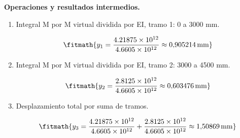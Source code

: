 \noindent\textbf{Operaciones y resultados intermedios.}

\begin{enumerate}

\item Integral M por M virtual dividida por EI, tramo 1: 0 a 3000 mm.

\[\fitmath{y_{1}=\frac{4.21875\times10^{12}}{4.6605\times10^{12}}\approx 0{,}905214\,\mathrm{mm}}\]

\item Integral M por M virtual dividida por EI, tramo 2: 3000 a 4500 mm.

\[\fitmath{y_{2}=\frac{2.8125\times10^{12}}{4.6605\times10^{12}}\approx 0{,}603476\,\mathrm{mm}}\]

\item Desplazamiento total por suma de tramos.

\[\fitmath{y_{3}=\frac{4.21875\times10^{12}}{4.6605\times10^{12}}+\frac{2.8125\times10^{12}}{4.6605\times10^{12}}\approx 1{,}50869\,\mathrm{mm}}\]

\end{enumerate}
